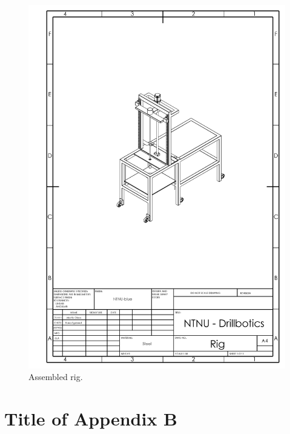 \newpage
\begin{figure} [H]
\centering
\includegraphics[width=1.0\textwidth]{figures/mechdrawings/Rig.JPG}
\caption{Assembled rig.} 
\label{fig:assemrig}
\end{figure}




\newpage
\section{Title of Appendix B} \label{App:AppendixB}


